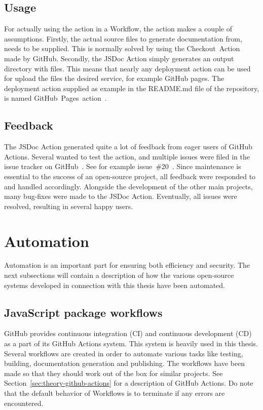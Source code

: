 \subsection{Usage}
For actually using the action in a Workflow, the action makes a couple of assumptions. Firstly, the actual source files to generate documentation from, needs to be supplied. This is normally solved by using the Checkout~Action~\cite{checkout-action} made by GitHub. Secondly, the JSDoc Action simply generates an output directory with files. This means that nearly any deployment action can be used for upload the files the desired service, for example GitHub pages. The deployment action supplied as example in the README.md file of the repository, is named GitHub~Pages~action~\cite{github-pages-action}.

\subsection{Feedback}
The JSDoc Action generated quite a lot of feedback from eager users of GitHub Actions. Several wanted to test the action, and multiple issues were filed in the issue tracker on GitHub~\cite{jsdoc-action-issue-tracker}. See for example issue~\#20~\cite{jsdoc-issue-20}. Since maintenance is essential to the success of an open-source project, all feedback were responded to and handled accordingly. Alongside the development of the other main projects, many bug-fixes were made to the JSDoc Action. Eventually, all issues were resolved, resulting in several happy users.

\section{Automation}
\label{sec:method-automation}
Automation is an important part for ensuring both efficiency and security. The next subsections will contain a description of how the various open-source systems developed in connection with this thesis have been automated.

\subsection{JavaScript package workflows}
\label{sec:method-javascript-package-workflows}
GitHub provides continuous integration (CI) and continuous development (CD) as a part of its GitHub Actions system. This system is heavily used in this thesis. Several workflows are created in order to automate various tasks like testing, building, documentation generation and publishing. The workflows have been made so that they should work out of the box for similar projects. See Section~\ref{sec:theory-github-actions} for a description of GitHub Actions. Do note that the default behavior of Workflows is to terminate if any errors are encountered.

